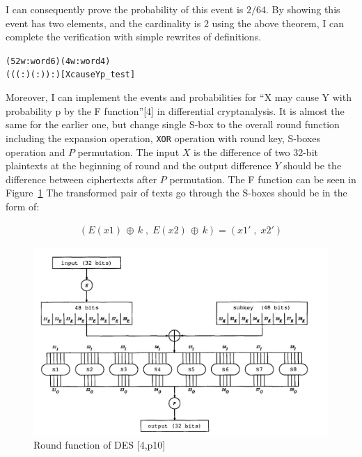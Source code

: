 \documentclass{article}
\begin{document}
I can consequently prove the probability of this event is $2/64$. By showing this event has two elements, and the cardinality
is 2 using the above theorem, I can complete the verification with simple rewrites of definitions.

\begin{alltt}
  \HOLTokenTurnstile{}  (52w :word6) (4w :word4) 
     ((( :) \HOLSymConst{/} ( :)) :)\hfill{[XcauseYp_test]}
\end{alltt}

Moreover, I can implement the events and probabilities for ``X may cause Y with probability p by the F function''[4] in
differential cryptanalysis. It is almost the same for the earlier one, but change single S-box to the overall round
function including the expansion operation, \verb|XOR| operation with round key, S-boxes operation and $P$ permutation. The
input $X$ is the difference of two 32-bit plaintexts at the beginning of round and the output difference $Y$ should
be the difference between ciphertexts after $P$ permutation. The F function can be seen in Figure~\ref{fig:form7}
The transformed pair of texts go through the S-boxes
should be in the form of:

\begin{equation*}
\begin{split}
(E(x1)\,\oplus\, k\;,\; E(x2)\,\oplus\, k)= (x1'\;,\;x2')
\end{split}
\end{equation*}

\begin{figure}
\centering
\includegraphics[width=0.75\linewidth]{F function}
\caption{\label{fig:form7} Round function of DES [4,p10]}
\end{figure}
\end{document}
